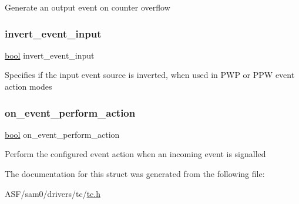 Generate an output event on counter overflow \mbox{\label{structtc__events_a5d288e8017f6f856d3412544bb2e691f}} 
\subsubsection{\texorpdfstring{invert\_event\_input}{invert\_event\_input}}
{\footnotesize\ttfamily \mbox{\hyperlink{group__group__sam0__utils_ga97a80ca1602ebf2303258971a2c938e2}{bool}} invert\+\_\+event\+\_\+input}

Specifies if the input event source is inverted, when used in P\+WP or P\+PW event action modes \mbox{\label{structtc__events_acf7887580241865721933e19311d3af3}} 
\subsubsection{\texorpdfstring{on\_event\_perform\_action}{on\_event\_perform\_action}}
{\footnotesize\ttfamily \mbox{\hyperlink{group__group__sam0__utils_ga97a80ca1602ebf2303258971a2c938e2}{bool}} on\+\_\+event\+\_\+perform\+\_\+action}

Perform the configured event action when an incoming event is signalled 

The documentation for this struct was generated from the following file\+:\begin{DoxyCompactItemize}
\item 
A\+S\+F/sam0/drivers/tc/\mbox{\hyperlink{drivers_2tc_2tc_8h}{tc.\+h}}\end{DoxyCompactItemize}
